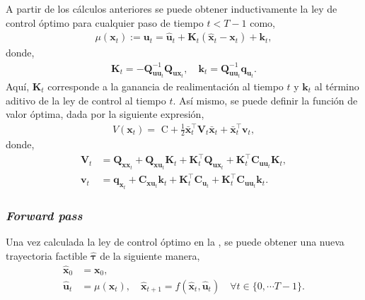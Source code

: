 A partir de los cálculos anteriores se puede obtener inductivamente la ley de control óptimo para cualquier paso de tiempo $t<T-1$ como, 
\begin{align} \label{eq:control_law}
    \mu(\mathbf{x}_t) := \mathbf{u}_t = \hat{\mathbf{u}}_t + \mathbf{K}_t(\hat{\mathbf{x}}_t-\mathbf{x}_t) + \mathbf{k}_t,
\end{align}
donde,
\begin{align}
\mathbf{K}_{t} = -\mathbf{Q}_{\mathbf{uu}_t}^{-1}\mathbf{Q}_{\mathbf{ux}_t}, \quad \mathbf{k}_{t} = \mathbf{Q}_{\mathbf{uu}_t}^{-1} \mathbf{q}_{\mathbf{u}_t}.
\end{align}
Aquí, $\mathbf{K}_{t}$ corresponde a la ganancia de realimentación al tiempo $t$ y $\mathbf{k}_{t}$ al término aditivo de la ley de control al tiempo $t$.
Así mismo, se puede definir la función de valor óptima, dada por la siguiente expresión,
\begin{align}
    V(\mathbf{x}_{t}) = \text{ C} 
    + \frac{1}{2}\bar{\mathbf{x}}_{t}^{\top}
    \mathbf{V}_{t}
    \bar{\mathbf{x}}_{t}
    + 
    \bar{\mathbf{x}}_{t}^{\top}
    \mathbf{v}_{t},
\end{align}
donde,
\begin{align}
    \mathbf{V}_{t} &= \mathbf{Q}_{\mathbf{xx}_{t}}
    + \mathbf{Q}_{\mathbf{xu}_{t}}\mathbf{K}_{t}
    + \mathbf{K}_{t}^{\top}\mathbf{Q}_{\mathbf{ux}_t}
    + \mathbf{K}_{t}^{\top}\mathbf{C}_{\mathbf{uu}_t}\mathbf{K}_{t}, \\
    \mathbf{v}_{t} &= \mathbf{q}_{\mathbf{x}_{t}}
    + \mathbf{C}_{\mathbf{xu}_{t}}\mathbf{k}_{t}
    +\mathbf{K}_{t}^{\top}\mathbf{C}_{\mathbf{u}_{t}}
    + \mathbf{K}_{t}^{\top}\mathbf{C}_{\mathbf{uu}_{t}}\mathbf{k}_{t}.
\end{align}
\subsubsection{\textit{Forward pass}}
Una vez calculada la ley de control óptimo en la , se puede obtener una nueva trayectoria factible $\hat{\bm\tau}$ de la siguiente manera,
\begin{align}
    \hat{\mathbf{x}}_0 &= \mathbf{x}_0, \\
    \hat{\mathbf{u}}_t &= \mu(\mathbf{x}_t), \quad \hat{\mathbf{x}}_{t+1} =f(\hat{\mathbf{x}}_t, \hat{\mathbf{u}}_t)\quad\forall t \in \{0, \cdots T-1\} .
\end{align}

